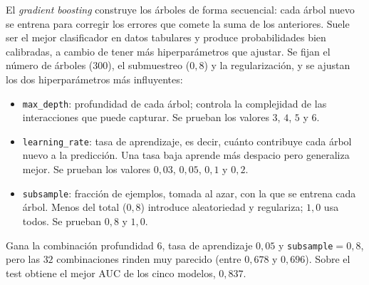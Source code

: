 \documentclass[12pt,a4paper]{report}
\theoremstyle{definition}
\newcommand{\tc}[1]{\texttt{#1}}
\begin{document}
El \emph{gradient boosting} construye los árboles de forma secuencial: cada árbol nuevo se
entrena para corregir los errores que comete la suma de los anteriores. Suele ser el mejor clasificador en datos tabulares y
produce probabilidades bien calibradas, a cambio de tener más hiperparámetros que ajustar. Se
fijan el número de árboles ($300$), el submuestreo ($0{,}8$) y la regularización, y se ajustan
los dos hiperparámetros más influyentes:

\begin{itemize}
\item \tc{max\_depth}: profundidad de cada árbol; controla la complejidad de las interacciones
que puede capturar. Se prueban los valores $3$, $4$, $5$ y $6$.
\item \tc{learning\_rate}: tasa de aprendizaje, es decir, cuánto contribuye cada árbol nuevo a
la predicción. Una tasa baja aprende más despacio pero generaliza mejor. Se prueban los
valores $0{,}03$, $0{,}05$, $0{,}1$ y $0{,}2$.
\item \tc{subsample}: fracción de ejemplos, tomada al azar, con la que se entrena cada árbol.
Menos del total ($0{,}8$) introduce aleatoriedad y regulariza; $1{,}0$ usa todos. Se prueban
$0{,}8$ y $1{,}0$.
\end{itemize}

Gana la combinación profundidad $6$, tasa de
aprendizaje $0{,}05$ y \tc{subsample}${}=0{,}8$, pero las $32$ combinaciones rinden muy
parecido (entre $0{,}678$ y $0{,}696$). Sobre el test obtiene el
mejor AUC de los cinco modelos, $0{,}837$.
\end{document}
